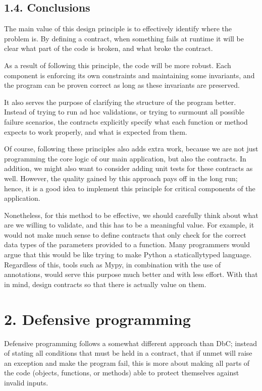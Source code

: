 \documentclass[a4paper,10pt,english]{sphinxmanual}
\begin{document}
\subsection{1.4. Conclusions}
\label{\detokenize{chapters/3_general_traits/index:conclusions}}
The main value of this design principle is to effectively identify where the problem is. By defining a
contract, when something fails at runtime it will be clear what part of the code is broken, and what broke the
contract.

As a result of following this principle, the code will be more robust. Each component is enforcing its own
constraints and maintaining some invariants, and the program can be proven correct as long as these invariants
are preserved.

It also serves the purpose of clarifying the structure of the program better. Instead of trying to run ad hoc
validations, or trying to surmount all possible failure scenarios, the contracts explicitly specify what each
function or method expects to work properly, and what is expected from them.

Of course, following these principles also adds extra work, because we are not just programming the core logic
of our main application, but also the contracts. In addition, we might also want to consider adding unit tests
for these contracts as well. However, the quality gained by this approach pays off in the long run; hence, it
is a good idea to implement this principle for critical components of the application.

Nonetheless, for this method to be effective, we should carefully think about what are we willing to validate,
and this has to be a meaningful value. For example, it would not make much sense to define contracts that only
check for the correct data types of the parameters provided to a function. Many programmers would argue that
this would be like trying to make Python a statically\sphinxhyphen{}typed language. Regardless of this, tools such as Mypy,
in combination with the use of annotations, would serve this purpose much better and with less effort. With
that in mind, design contracts so that there is actually value on them.


\section{2. Defensive programming}
\label{\detokenize{chapters/3_general_traits/index:defensive-programming}}
Defensive programming follows a somewhat different approach than DbC; instead of stating all conditions that
must be held in a contract, that if unmet will raise an exception and make the program fail, this is more
about making all parts of the code (objects, functions, or methods) able to protect themselves against invalid
inputs.
\end{document}
